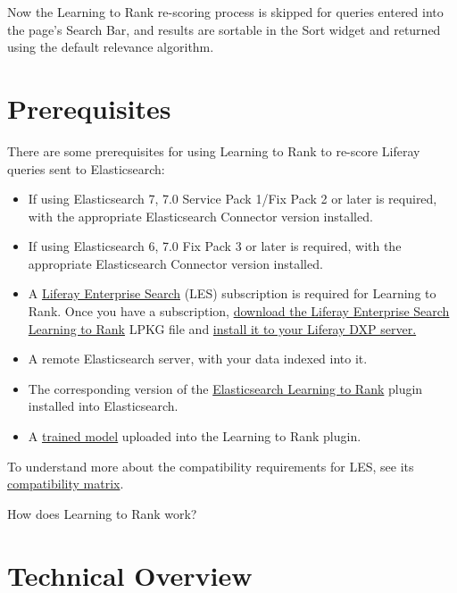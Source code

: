 Now the Learning to Rank re-scoring process is skipped for queries
entered into the page's Search Bar, and results are sortable in the Sort
widget and returned using the default relevance algorithm.

\section{Prerequisites}\label{prerequisites}

There are some prerequisites for using Learning to Rank to re-score
Liferay queries sent to Elasticsearch:

\begin{itemize}
\item
  If using Elasticsearch 7, 7.0 Service Pack 1/Fix Pack 2 or later is
  required, with the appropriate Elasticsearch Connector version
  installed.
\item
  If using Elasticsearch 6, 7.0 Fix Pack 3 or later is required, with
  the appropriate Elasticsearch Connector version installed.
\item
  A
  \href{https://help.liferay.com/hc/en-us/articles/360014400932}{Liferay
  Enterprise Search} (LES) subscription is required for Learning to
  Rank. Once you have a subscription,
  \href{https://customer.liferay.com/downloads}{download the Liferay
  Enterprise Search Learning to Rank} LPKG file and
  \href{/docs/7-2/user/-/knowledge_base/u/installing-apps-manually\#installing-apps-manually}{install
  it to your Liferay DXP server.}
\item
  A remote Elasticsearch server, with your data indexed into it.
\item
  The corresponding version of the
  \href{https://github.com/o19s/elasticsearch-learning-to-rank}{Elasticsearch
  Learning to Rank} plugin installed into Elasticsearch.
\item
  A
  \href{https://elasticsearch-learning-to-rank.readthedocs.io/en/latest/training-models.html}{trained
  model} uploaded into the Learning to Rank plugin.
\end{itemize}

To understand more about the compatibility requirements for LES, see its
\href{https://help.liferay.com/hc/en-us/articles/360016511651\#Liferay-Enterprise-Search}{compatibility
matrix}.

How does Learning to Rank work?

\section{Technical Overview}\label{technical-overview}


